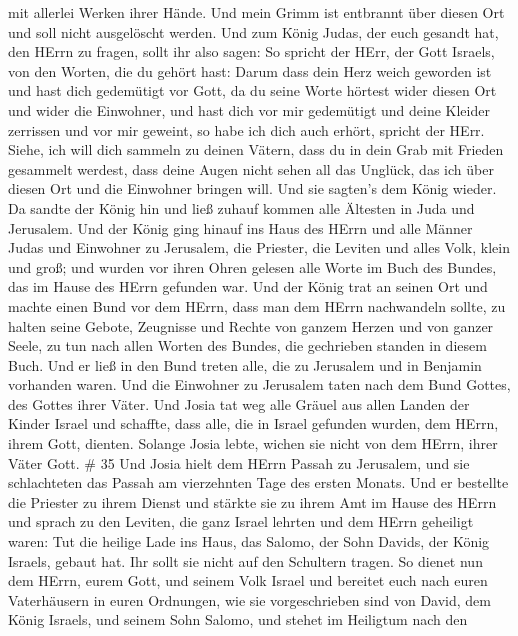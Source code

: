 mit allerlei Werken ihrer Hände. Und mein Grimm ist entbrannt über
diesen Ort und soll nicht ausgelöscht werden.  Und zum
König Judas, der euch gesandt hat, den HErrn zu fragen, sollt ihr also
sagen: So spricht der HErr, der Gott Israels, von den Worten, die du
gehört hast:  Darum dass dein Herz weich geworden ist und
hast dich gedemütigt vor Gott, da du seine Worte hörtest wider diesen
Ort und wider die Einwohner, und hast dich vor mir gedemütigt und deine
Kleider zerrissen und vor mir geweint, so habe ich dich auch erhört,
spricht der HErr.  Siehe, ich will dich sammeln zu deinen
Vätern, dass du in dein Grab mit Frieden gesammelt werdest, dass deine
Augen nicht sehen all das Unglück, das ich über diesen Ort und die
Einwohner bringen will. Und sie sagten's dem König wieder. 
Da sandte der König hin und ließ zuhauf kommen alle Ältesten in Juda und
Jerusalem.  Und der König ging hinauf ins Haus des HErrn
und alle Männer Judas und Einwohner zu Jerusalem, die Priester, die
Leviten und alles Volk, klein und groß; und wurden vor ihren Ohren
gelesen alle Worte im Buch des Bundes, das im Hause des HErrn gefunden
war.  Und der König trat an seinen Ort und machte einen
Bund vor dem HErrn, dass man dem HErrn nachwandeln sollte, zu halten
seine Gebote, Zeugnisse und Rechte von ganzem Herzen und von ganzer
Seele, zu tun nach allen Worten des Bundes, die gechrieben standen in
diesem Buch.  Und er ließ in den Bund treten alle, die zu
Jerusalem und in Benjamin vorhanden waren. Und die Einwohner zu
Jerusalem taten nach dem Bund Gottes, des Gottes ihrer Väter.
 Und Josia tat weg alle Gräuel aus allen Landen der Kinder
Israel und schaffte, dass alle, die in Israel gefunden wurden, dem
HErrn, ihrem Gott, dienten. Solange Josia lebte, wichen sie nicht von
dem HErrn, ihrer Väter Gott. \# 35  Und Josia hielt dem
HErrn Passah zu Jerusalem, und sie schlachteten das Passah am
vierzehnten Tage des ersten Monats.  Und er bestellte die
Priester zu ihrem Dienst und stärkte sie zu ihrem Amt im Hause des HErrn
 und sprach zu den Leviten, die ganz Israel lehrten und dem
HErrn geheiligt waren: Tut die heilige Lade ins Haus, das Salomo, der
Sohn Davids, der König Israels, gebaut hat. Ihr sollt sie nicht auf den
Schultern tragen. So dienet nun dem HErrn, eurem Gott, und seinem Volk
Israel  und bereitet euch nach euren Vaterhäusern in euren
Ordnungen, wie sie vorgeschrieben sind von David, dem König Israels, und
seinem Sohn Salomo,  und stehet im Heiligtum nach den
